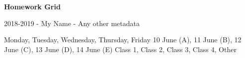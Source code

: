 \documentclass{hwgrid}
\begin{document}
{\Large\bfseries Homework Grid}

\vspace{0.25cm}

{\large 2018-2019 - My Name - Any other metadata}

\insertgridfixed
 {Monday, Tuesday, Wednesday, Thursday, Friday}
 {
   10 June (A),
   11 June (B),
   12 June (C),
   13 June (D),
   14 June (E)
 }
 {
   Class 1,
   Class 2,
   Class 3,
   Class 4,
   Other
 }
\end{document}
